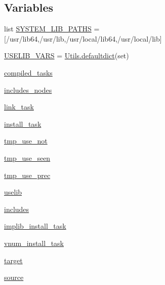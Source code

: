 \subsection*{Variables}
\begin{DoxyCompactItemize}
\item 
list \hyperlink{namespacewaflib_1_1_tools_1_1ccroot_a80110f39903a6d01ca982662f57ad0a5}{S\+Y\+S\+T\+E\+M\+\_\+\+L\+I\+B\+\_\+\+P\+A\+T\+HS} = \mbox{[}\textquotesingle{}/usr/lib64\textquotesingle{},\textquotesingle{}/usr/lib\textquotesingle{},\textquotesingle{}/usr/local/lib64\textquotesingle{},\textquotesingle{}/usr/local/lib\textquotesingle{}\mbox{]}
\item 
\hyperlink{namespacewaflib_1_1_tools_1_1ccroot_afb22745532c5000bf45eb62d52d3168e}{U\+S\+E\+L\+I\+B\+\_\+\+V\+A\+RS} = \hyperlink{classwaflib_1_1_utils_1_1defaultdict}{Utils.\+defaultdict}(set)
\item 
\hyperlink{namespacewaflib_1_1_tools_1_1ccroot_aa051551e52d0c141f06bb61cbac4f96a}{compiled\+\_\+tasks}
\item 
\hyperlink{namespacewaflib_1_1_tools_1_1ccroot_a0af86ecee51f1b256395cd8541496fc7}{includes\+\_\+nodes}
\item 
\hyperlink{namespacewaflib_1_1_tools_1_1ccroot_ae241b759e3c8c26160691a6716025a0c}{link\+\_\+task}
\item 
\hyperlink{namespacewaflib_1_1_tools_1_1ccroot_ac24fbdf7fa334f84ac2e4dfe4692e6ec}{install\+\_\+task}
\item 
\hyperlink{namespacewaflib_1_1_tools_1_1ccroot_abf4a606714479d4b96de9612e75a9cc2}{tmp\+\_\+use\+\_\+not}
\item 
\hyperlink{namespacewaflib_1_1_tools_1_1ccroot_a9e54720a8e17aa5bbdae8d139248b554}{tmp\+\_\+use\+\_\+seen}
\item 
\hyperlink{namespacewaflib_1_1_tools_1_1ccroot_af41694249f5720e661361f5105a8b2bf}{tmp\+\_\+use\+\_\+prec}
\item 
\hyperlink{namespacewaflib_1_1_tools_1_1ccroot_a4751e5bc02be75bd1bf6f86a36375648}{uselib}
\item 
\hyperlink{namespacewaflib_1_1_tools_1_1ccroot_aed36da5a7a1a5b2c9fee82d659088f8e}{includes}
\item 
\hyperlink{namespacewaflib_1_1_tools_1_1ccroot_a9d8a5a841421e069e4725d12e7e7686b}{implib\+\_\+install\+\_\+task}
\item 
\hyperlink{namespacewaflib_1_1_tools_1_1ccroot_a1a4e673dcd88f117178d3a9bf3d87e4c}{vnum\+\_\+install\+\_\+task}
\item 
\hyperlink{namespacewaflib_1_1_tools_1_1ccroot_a69ab99c107908aecb0f73e5d3f7c0860}{target}
\item 
\hyperlink{namespacewaflib_1_1_tools_1_1ccroot_a30ed7b4655b311249958f4434cd919c1}{source}
\end{DoxyCompactItemize}


